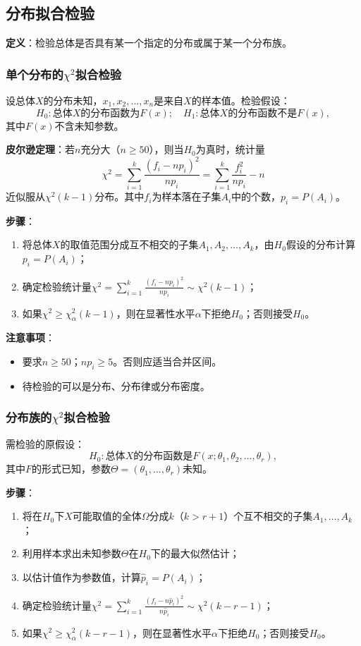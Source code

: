 \documentclass[11pt,a4paper]{report}
\theoremstyle{definition}
\theoremstyle{plain}
\begin{document}
\subsection{分布拟合检验}

\textbf{定义}：检验总体是否具有某一个指定的分布或属于某一个分布族。

\subsubsection{单个分布的$\chi^2$拟合检验}

设总体$X$的分布未知，$x_1,x_2,\ldots,x_n$是来自$X$的样本值。检验假设：
\[
H_0:\text{总体}X\text{的分布函数为}F(x);\quad H_1:\text{总体}X\text{的分布函数不是}F(x),
\]
其中$F(x)$不含未知参数。

\textbf{皮尔逊定理}：若$n$充分大（$n\geq 50$），则当$H_0$为真时，统计量
\[
\chi^2=\sum_{i=1}^{k}\frac{(f_i-np_i)^2}{np_i}=\sum_{i=1}^{k}\frac{f_i^2}{np_i}-n
\]
近似服从$\chi^2(k-1)$分布。其中$f_i$为样本落在子集$A_i$中的个数，$p_i=P(A_i)$。

\textbf{步骤}：
\begin{enumerate}[label=\arabic*.,leftmargin=2em]
    \item 将总体$X$的取值范围分成互不相交的子集$A_1,A_2,\ldots,A_k$，由$H_0$假设的分布计算$p_i=P(A_i)$；
    \item 确定检验统计量$\chi^2=\sum_{i=1}^{k}\frac{(f_i-np_i)^2}{np_i}\sim\chi^2(k-1)$；
    \item 如果$\chi^2\geq\chi_\alpha^2(k-1)$，则在显著性水平$\alpha$下拒绝$H_0$；否则接受$H_0$。
\end{enumerate}

\textbf{注意事项}：
\begin{itemize}[leftmargin=2em]
    \item 要求$n\geq 50$；$np_i\geq 5$。否则应适当合并区间。
    \item 待检验的可以是分布、分布律或分布密度。
\end{itemize}

\subsubsection{分布族的$\chi^2$拟合检验}

需检验的原假设：
\[
H_0:\text{总体}X\text{的分布函数是}F(x;\theta_1,\theta_2,\ldots,\theta_r),
\]
其中$F$的形式已知，参数$\Theta=(\theta_1,\ldots,\theta_r)$未知。

\textbf{步骤}：
\begin{enumerate}[label=\arabic*.,leftmargin=2em]
    \item 将在$H_0$下$X$可能取值的全体$\Omega$分成$k$（$k>r+1$）个互不相交的子集$A_1,\ldots,A_k$；
    \item 利用样本求出未知参数$\Theta$在$H_0$下的最大似然估计；
    \item 以估计值作为参数值，计算$\hat{p}_i=P(A_i)$；
    \item 确定检验统计量$\chi^2=\sum_{i=1}^{k}\frac{(f_i-n\hat{p}_i)^2}{n\hat{p}_i}\sim\chi^2(k-r-1)$；
    \item 如果$\chi^2\geq\chi_\alpha^2(k-r-1)$，则在显著性水平$\alpha$下拒绝$H_0$；否则接受$H_0$。
\end{enumerate}
\end{document}
